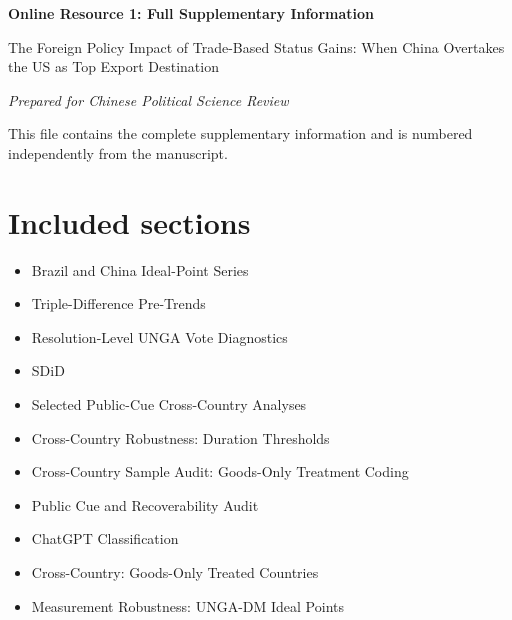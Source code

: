 \documentclass[11pt]{article}
\begin{document}
\thispagestyle{empty}

\begin{center}

{\Large\bfseries Online Resource 1: Full Supplementary Information\par}

\vspace{0.5cm}

{\large The Foreign Policy Impact of Trade-Based Status Gains: When China Overtakes the US as Top Export Destination\par}

\vspace{0.3cm}

\emph{Prepared for Chinese Political Science Review}

\end{center}

\vspace{0.8cm}

This file contains the complete supplementary information and is numbered independently from the manuscript.

\section*{Included sections}

\begin{itemize}

\item Brazil and China Ideal-Point Series

\item Triple-Difference Pre-Trends

\item Resolution-Level UNGA Vote Diagnostics

\item SDiD

\item Selected Public-Cue Cross-Country Analyses

\item Cross-Country Robustness: Duration Thresholds

\item Cross-Country Sample Audit: Goods-Only Treatment Coding

\item Public Cue and Recoverability Audit

\item ChatGPT Classification

\item Cross-Country: Goods-Only Treated Countries

\item Measurement Robustness: UNGA-DM Ideal Points

\end{itemize}
\end{document}
